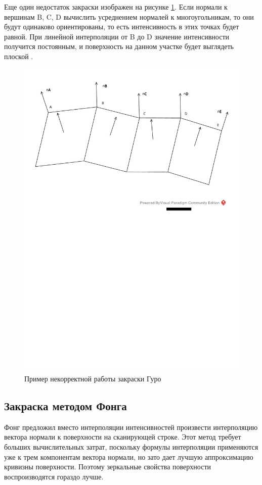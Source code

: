 Еще один недостаток закраски изображен на рисунке \ref{fig:Guro_book}. Если нормали к вершинам B, C, D вычислить усреднением нормалей к многоугольникам, то они будут одинаково ориентированы, то есть интенсивность в этих точках будет равной. При линейной интерполяции от B до D значение интенсивности получится постоянным, и поверхность на данном участке будет выглядеть плоской \cite{lit5}.

\begin{figure}[H]
	\centering
	\includegraphics[width=1.0\textwidth]{Knizhka.pdf}
	\caption{Пример некорректной работы закраски Гуро}
	\label{fig:Guro_book}
\end{figure}

\subsection{Закраска методом Фонга}
Фонг предложил вместо интерполяции интенсивностей произвести интерполяцию вектора нормали к поверхности на сканирующей строке. Этот метод требует больших вычислительных затрат, поскольку формулы интерполяции применяются уже к трем компонентам вектора нормали, но зато дает лучшую аппроксимацию кривизны поверхности. Поэтому зеркальные свойства поверхности воспроизводятся гораздо лучше.

